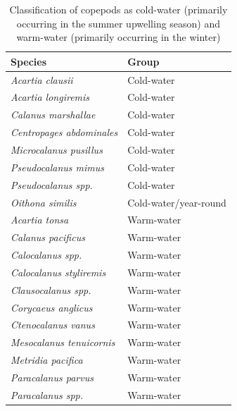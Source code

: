 \documentclass[12pt,twoside]{reedthesis}
\begin{document}
\begin{table}[htbp] 
	
	\caption[Seasonal classification of copepods]{Classification of copepods as cold-water (primarily occurring in the summer upwelling season) and warm-water (primarily occurring in the winter) \autocite{Fisheries2024, Peterson2003, Peterson1977}}  %
	
	\begin{center} 
		\begin{tabular}{l l}  
			\toprule
			Species &  Group \\ 
			\midrule 
			\textit{Acartia clausii} 				& 	Cold-water 	 \\ 
			\textit{Acartia longiremis}	& Cold-water  \\
			\textit{Calanus marshallae}	& Cold-water  \\
			\textit{Centropages abdominales}	& Cold-water  \\
			\textit{Microcalanus pusillus}	& Cold-water  \\
			\textit{Pseudocalanus mimus} & Cold-water  \\
			\textit{Pseudocalanus spp.}	& Cold-water  \\
			\textit{Oithona similis}	& Cold-water/year-round  \\
			\textit{Acartia tonsa}	& Warm-water  \\
			\textit{Calanus pacificus}	& Warm-water  \\
			\textit{Calocalanus spp.}	& Warm-water  \\
			\textit{Calocalanus styliremis}	& Warm-water  \\
			\textit{Clausocalanus spp.}	& Warm-water  \\
			\textit{Corycaeus anglicus}	& Warm-water  \\
			\textit{Ctenocalanus vanus}	& Warm-water  \\
			\textit{Mesocalanus tenuicornis}	& Warm-water  \\
			\textit{Metridia pacifica}	& Warm-water  \\
			\textit{Paracalanus parvus}	& Warm-water  \\
			\textit{Paracalanus spp.}	& Warm-water  \\
			\bottomrule 
		\end{tabular}
	\end{center}
	\label{CopepodGroups} %
\end{table}
\end{document}
